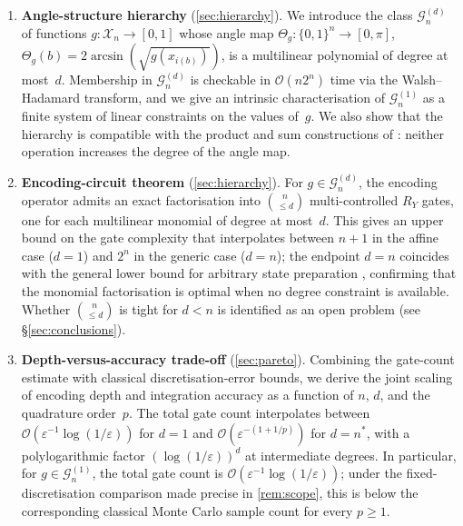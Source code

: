 \documentclass[12pt,a4paper]{article}
\theoremstyle{plain}
\theoremstyle{definition}
\theoremstyle{remark}
\newcommand{\Ry}{R_Y}
\newcommand{\Gclass}[2]{\mathcal{G}_{#1}^{(#2)}}
\newcommand{\Thetag}{\Theta_g}
\begin{document}
\begin{enumerate}[label=(\roman*)]
\item
  \textbf{Angle-structure hierarchy} (\cref{sec:hierarchy}).
  We introduce the class $\Gclass{n}{d}$ of functions
  $g:\mathcal{X}_n\to[0,1]$ whose angle map
  $\Thetag:\{0,1\}^n\to[0,\pi]$,
  $\Thetag(b)=2\arcsin(\sqrt{g(x_{i(b)})})$,
  is a multilinear polynomial of degree at most~$d$.
  Membership in $\Gclass{n}{d}$ is checkable in
  $\mathcal{O}(n2^n)$ time via the Walsh--Hadamard transform, and we
  give an intrinsic characterisation of $\Gclass{n}{1}$ as a finite
  system of linear constraints on the values of~$g$.
  We also show that the hierarchy is compatible with the product and
  sum constructions of \cite{CarreraVazquezWoerner2020}: neither
  operation increases the degree of the angle map.

\item
  \textbf{Encoding-circuit theorem} (\cref{sec:hierarchy}).
  For $g\in\Gclass{n}{d}$, the encoding operator admits an exact
  factorisation into $\binom{n}{\leq d}$ multi-controlled $\Ry$ gates,
  one for each multilinear monomial of degree at most~$d$.
  This gives an upper bound on the gate complexity that interpolates
  between $n+1$ in the affine case ($d=1$) and $2^n$ in the generic
  case ($d=n$); the endpoint $d=n$ coincides with the general lower
  bound for arbitrary state preparation \cite{ShendeBullockMarkov2006},
  confirming that the monomial factorisation is optimal when no
  degree constraint is available.
  Whether $\binom{n}{\leq d}$ is tight for $d<n$ is identified as an
  open problem (see \S\ref{sec:conclusions}).

\item
  \textbf{Depth-versus-accuracy trade-off} (\cref{sec:pareto}).
  Combining the gate-count estimate with classical discretisation-error
  bounds, we derive the joint scaling of encoding depth and integration
  accuracy as a function of $n$, $d$, and the quadrature order~$p$.
  The total gate count interpolates between
  $\mathcal{O}(\varepsilon^{-1}\log(1/\varepsilon))$ for $d=1$ and
  $\mathcal{O}(\varepsilon^{-(1+1/p)})$ for $d=n^*$, with a
  polylogarithmic factor $(\log(1/\varepsilon))^d$ at intermediate
  degrees.
  In particular, for $g\in\Gclass{n}{1}$, the total gate count is
  $\mathcal{O}(\varepsilon^{-1}\log(1/\varepsilon))$; under the
  fixed-discretisation comparison made precise in \cref{rem:scope},
  this is below the corresponding classical Monte Carlo sample count
  for every $p\ge 1$.


\end{enumerate}
\end{document}
